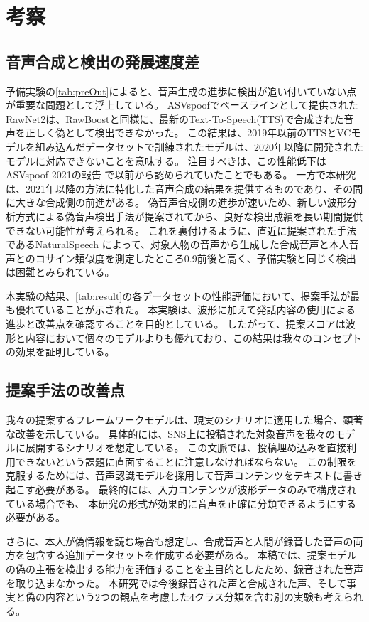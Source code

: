 \section{考察}\label{sec:cnt_evl}
\subsection{音声合成と検出の発展速度差}
予備実験の\cref{tab:preOut}によると、音声生成の進歩に検出が追い付いていない点が重要な問題として浮上している。
ASVspoofでベースラインとして提供されたRawNet2は、RawBoostと同様に、最新のText-To-Speech(TTS)で合成された音声を正しく偽として検出できなかった。
この結果は、2019年以前のTTSとVCモデルを組み込んだデータセットで訓練されたモデルは、2020年以降に開発されたモデルに対応できないことを意味する。
注目すべきは、この性能低下はASVspoof 2021の報告 \cite{yamagishi21_asvspoof}で以前から認められていたことでもある。
一方で本研究は、2021年以降の方法に特化した音声合成の結果を提供するものであり、その間に大きな合成側の前進がある。
偽音声合成側の進歩が速いため、新しい波形分析方式による偽音声検出手法が提案されてから、良好な検出成績を長い期間提供できない可能性が考えられる。
これを裏付けるように、直近に提案された手法であるNaturalSpeech \cite{10409539} によって、対象人物の音声から生成した合成音声と本人音声とのコサイン類似度を測定したところ0.9前後と高く、予備実験と同じく検出は困難とみられている。

本実験の結果、\cref{tab:result}の各データセットの性能評価において、提案手法が最も優れていることが示された。
本実験は、波形に加えて発話内容の使用による進歩と改善点を確認することを目的としている。 
したがって、提案スコアは波形と内容において個々のモデルよりも優れており、この結果は我々のコンセプトの効果を証明している。

\subsection{提案手法の改善点}
我々の提案するフレームワークモデルは、現実のシナリオに適用した場合、顕著な改善を示している。
具体的には、SNS上に投稿された対象音声を我々のモデルに展開するシナリオを想定している。
この文脈では、投稿埋め込みを直接利用できないという課題に直面することに注意しなければならない。
この制限を克服するためには、音声認識モデルを採用して音声コンテンツをテキストに書き起こす必要がある。
最終的には、入力コンテンツが波形データのみで構成されている場合でも、
本研究の形式が効果的に音声を正確に分類できるようにする必要がある。

さらに、本人が偽情報を読む場合も想定し、合成音声と人間が録音した音声の両方を包含する追加データセットを作成する必要がある。
本稿では、提案モデルの偽の主張を検出する能力を評価することを主目的としたため、録音された音声を取り込まなかった。
本研究では今後録音された声と合成された声、そして事実と偽の内容という2つの観点を考慮した4クラス分類を含む別の実験も考えられる。